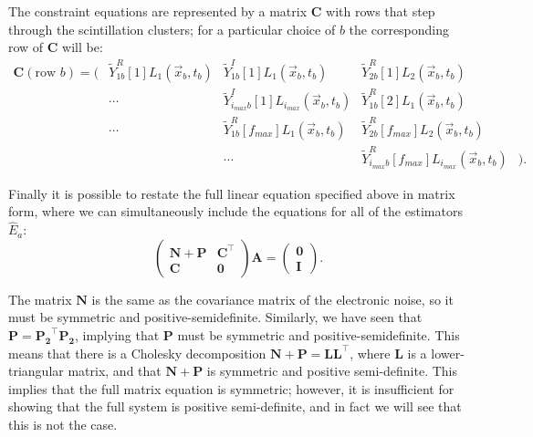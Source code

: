 The constraint equations are represented by a matrix $\mathbf{C}$ with rows that step through the scintillation clusters; for a particular choice of $b$ the corresponding row of $\mathbf{C}$  will be:
\begin{equation} \begin{matrix}
\mathbf{C}(\text{row $b$}) = \bigg( & \widetilde{Y}^R_{1 b}[1] L_1(\vec{x}_b, t_b) & \widetilde{Y}^I_{1 b}[1] L_1(\vec{x}_b, t_b) & \widetilde{Y}^R_{2 b}[1] L_2(\vec{x}_b, t_b) \\
&\cdots & \widetilde{Y}^I_{i_{max} b}[1] L_{i_{max}}(\vec{x}_b, t_b) & \widetilde{Y}^R_{1 b}[2] L_1(\vec{x}_b, t_b) \\
&\cdots & \widetilde{Y}^R_{1 b}[f_{max}] L_1(\vec{x}_b, t_b) & \widetilde{Y}^R_{2 b}[f_{max}] L_2(\vec{x}_b, t_b) \\
& & \cdots & \widetilde{Y}^R_{i_{max} b}[f_{max}] L_{i_{max}}(\vec{x}_b, t_b) & \bigg).
\end{matrix}\end{equation}

Finally it is possible to restate the full linear equation specified above in matrix form, where we can simultaneously include the equations for all of the estimators $\widehat{E}_a$:
\begin{equation}\label{eqn:FullMatrixFormulation}
\begin{pmatrix}
\mathbf{N} + \mathbf{P} & \mathbf{C}^{\top} \\
\mathbf{C} & \mathbf{0}
\end{pmatrix} \mathbf{A} =
\begin{pmatrix}
\mathbf{0} \\
\mathbf{I}
\end{pmatrix}.
\end{equation}

The matrix $\mathbf{N}$ is the same as the covariance matrix of the electronic noise, so it must be symmetric and positive-semidefinite.  Similarly, we have seen that $\mathbf{P} = \mathbf{P_2}^{\top} \mathbf{P_2}$, implying that $\mathbf{P}$ must be symmetric and positive-semidefinite.  This means that there is a Cholesky decomposition $\mathbf{N} + \mathbf{P} = \mathbf{L}\mathbf{L}^{\top}$, where $\mathbf{L}$ is a lower-triangular matrix, and that $\mathbf{N} + \mathbf{P}$ is symmetric and positive semi-definite.  This implies that the full matrix equation is symmetric; however, it is insufficient for showing that the full system is positive semi-definite, and in fact we will see that this is not the case.

